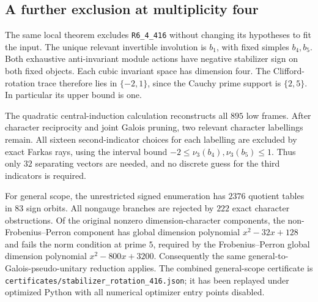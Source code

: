 \subsection{A further exclusion at multiplicity four}
\label{subsec:stabilizer-rotation-416}
The same local theorem excludes \texttt{R6\_4\_416} without changing its
hypotheses to fit the input.  The unique relevant invertible involution is
$b_1$, with fixed simples $b_4,b_5$.  Both exhaustive anti-invariant module
actions have negative stabilizer sign on both fixed objects.  Each cubic
invariant space has dimension four.  The Clifford-rotation trace therefore
lies in $\{-2,1\}$, since the Cauchy prime support is $\{2,5\}$.
In particular its upper bound is one.

The quadratic central-induction calculation reconstructs all $895$ low
frames.  After character reciprocity and joint Galois pruning, two relevant
character labellings remain.  All sixteen second-indicator choices for each
labelling are excluded by exact Farkas rays, using the interval bound
$-2\leq\nu_3(b_4),\nu_3(b_5)\leq1$.  Thus only $32$ separating vectors are
needed, and no discrete guess for the third indicators is required.

For general scope, the unrestricted signed enumeration has $2376$ quotient
tables in $83$ sign orbits.  All nongauge branches are rejected by $222$
exact character obstructions.  Of the original nonzero dimension-character
components, the non-Frobenius--Perron component has global dimension polynomial
$x^2-32x+128$ and fails the norm condition at prime $5$, required by the
Frobenius--Perron global dimension polynomial $x^2-800x+3200$.
Consequently the same general-to-Galois-pseudo-unitary reduction applies.
The combined general-scope certificate is
\texttt{certificates/stabilizer\_rotation\_416.json}; it has been replayed
under optimized Python with all numerical optimizer entry points disabled.
